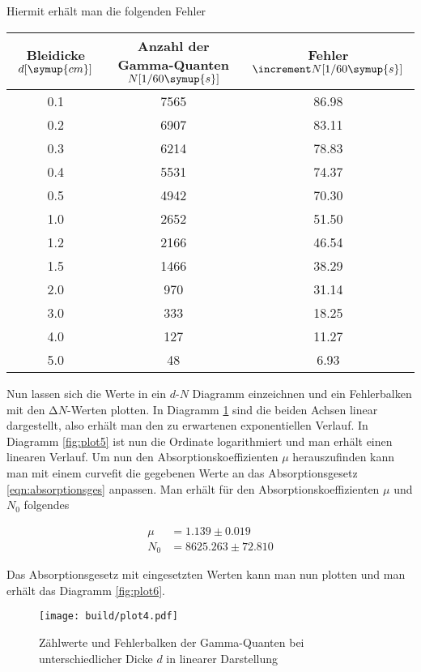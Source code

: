 \begin{flushleft}
Hiermit erhält man die folgenden Fehler
\end{flushleft}
\begin{table}
\centering
\label{tab:messwerte3}
\begin{tabular}{c c c}
    Bleidicke $d [\symup{cm}]$ & Anzahl der Gamma-Quanten $N [1{/}60\symup{s}]$ & Fehler $\increment N [1{/}60\symup{s}]$\\
    \midrule
    0.1 & 7565 & 86.98\\ 
    0.2 & 6907 & 83.11\\
    0.3 & 6214 & 78.83\\
    0.4 & 5531 & 74.37\\
    0.5 & 4942 & 70.30\\
    1.0 & 2652 & 51.50\\
    1.2 & 2166 & 46.54\\
    1.5 & 1466 & 38.29\\
    2.0 & 970  & 31.14\\
    3.0 & 333  & 18.25\\
    4.0 & 127  & 11.27\\
    5.0 & 48   & 6.93 \\
    \bottomrule
\end{tabular}
\end{table}
\begin{flushleft}
Nun lassen sich die Werte in ein $d$-$N$ Diagramm einzeichnen und ein Fehlerbalken mit den $\increment N$-Werten plotten. 
In Diagramm \ref{fig:plot4} sind die beiden Achsen linear dargestellt, also erhält man den zu erwartenen exponentiellen Verlauf.
In Diagramm \ref{fig:plot5} ist nun die Ordinate logarithmiert und man erhält einen linearen Verlauf.
Um nun den Absorptionskoeffizienten $\mu$ herauszufinden kann man mit einem curvefit die gegebenen Werte an das Absorptionsgesetz \eqref{eqn:absorptionsges} anpassen.
Man erhält für den Absorptionskoeffizienten $\mu$ und $N_{0}$ folgendes
\end{flushleft}
\begin{align}
\mu &= 1.139 \pm 0.019 \\
N_{0} &= 8625.263 \pm 72.810
\end{align}
\begin{flushleft}
Das Absorptionsgesetz mit eingesetzten Werten kann man nun plotten und man erhält das Diagramm \ref{fig:plot6}.
\end{flushleft}
\newpage
\begin{figure}[t]
  \centering
  \texttt{[image: build/plot4.pdf]}
  \caption{Zählwerte und Fehlerbalken der Gamma-Quanten bei unterschiedlicher Dicke $d$ in linearer Darstellung}
  \label{fig:plot4}
\end{figure}
